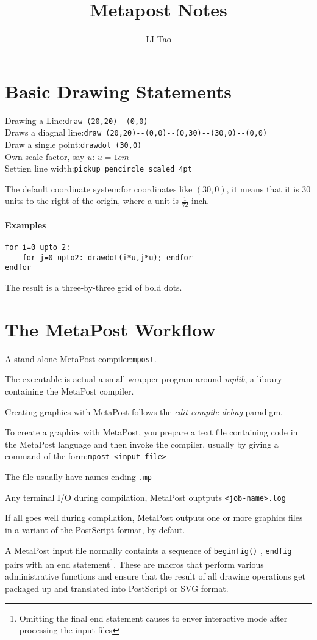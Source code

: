 \documentclass[a4paper,11pt]{article}
\author{LI Tao}
\title{Metapost Notes}
\begin{document}
\section{Basic Drawing Statements}
\begin{tabbing}
Drawing a Line:\hspace{1cm}\= \verb|draw (20,20)--(0,0)|\\
Draws a diagnal line:\>\verb|draw (20,20)--(0,0)--(0,30)--(30,0)--(0,0)|\\
Draw a single point:\>\verb|drawdot (30,0)|\\
Own scale factor, say $u$:\> $u=1cm$\\
Settign line width:\>\verb|pickup pencircle scaled 4pt|\\
\end{tabbing}
The default coordinate system:for coordinates like $(30,0)$, it means that it is 30 units to the right of the origin, where a unit is $\frac{1}{72}$ inch.
\paragraph{Examples}
\begin{verbatim}
for i=0 upto 2:
    for j=0 upto2: drawdot(i*u,j*u); endfor
endfor
\end{verbatim}
The result is a three-by-three grid of bold dots.
\section{The MetaPost Workflow}
A stand-alone MetaPost compiler:\verb|mpost|.

The executable is actual a small wrapper program around \emph{mplib}, a library containing the MetaPost compiler.

Creating graphics with MetaPost follows the \emph{edit-compile-debug} paradigm.

To create a graphics with MetaPost, you prepare a text file containing code in the MetaPost language and then invoke the compiler, usually by giving a command of the form:\verb|mpost <input file>|

The file usually have names ending \verb|.mp|

Any terminal I/O during compilation, MetaPost ouptputs \verb|<job-name>.log|

If all goes well during compilation, MetaPost outputs one or more graphics files in a variant of the PostScript format, by defaut.

A MetaPost input file normally containts a sequence of \verb|beginfig()| , \verb|endfig| pairs with an end statement\footnote{Omitting the final end statement causes to enver interactive mode after processing the input files}. These are macros that perform various administrative functions and ensure that the result of all drawing operations get packaged up and translated into PostScript or SVG format.
\end{document}
